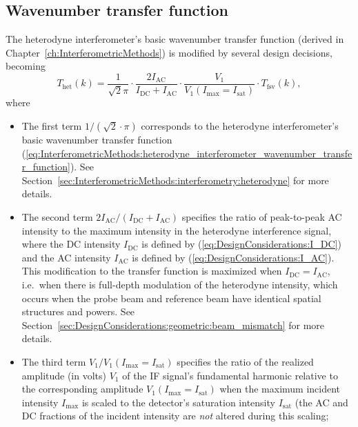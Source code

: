 \subsection{Wavenumber transfer function}
\label{sec:DesignConsiderations:summary:wavenumber_transfer_function}
The heterodyne interferometer's basic wavenumber transfer function
(derived in Chapter~\ref{ch:InterferometricMethods})
is modified by several design decisions, becoming
\begin{equation}
  T_{\text{het}}(k)
  =
  \frac{1}{\sqrt{2} \pi}
  \cdot
  \frac{2 I_{\text{AC}}}{I_{\text{DC}} + I_{\text{AC}}}
  \cdot
  \frac{V_1}{V_1(I_{\text{max}} = I_{\text{sat}})}
  \cdot
  T_{\text{fsv}}(k),
  \label{eq:DesignConsiderations:summary:heterodyne_interferometer_wavenumber_transfer_function}
\end{equation}
where
\begin{itemize}
  \item The first term $1 / (\sqrt{2} \cdot \pi)$
    corresponds to the heterodyne interferometer's
    basic wavenumber transfer function
    (\ref{eq:InterferometricMethods:heterodyne_interferometer_wavenumber_transfer_function}).
    See Section~\ref{sec:InterferometricMethods:interferometry:heterodyne}
    for more details.
  \item The second term $2 I_{\text{AC}} / (I_{\text{DC}} + I_{\text{AC}})$
    specifies the ratio of peak-to-peak AC intensity to the maximum intensity
    in the heterodyne interference signal, where
    the DC intensity $I_{\text{DC}}$ is defined by
    (\ref{eq:DesignConsiderations:I_DC}) and
    the AC intensity $I_{\text{AC}}$ is defined by
    (\ref{eq:DesignConsiderations:I_AC}).
    This modification to the transfer function
    is maximized when $I_{\text{DC}} = I_{\text{AC}}$, i.e.\
    when there is full-depth modulation of the heterodyne intensity, which
    occurs when the probe beam and reference beam
    have identical spatial structures and powers.
    See Section~\ref{sec:DesignConsiderations:geometric:beam_mismatch}
    for more details.
  \item The third term $V_1 / V_1(I_{\text{max}} = I_{\text{sat}})$
    specifies the ratio of the realized amplitude (in volts) $V_1$
    of the IF signal's fundamental harmonic
    relative to the corresponding amplitude
    $V_1(I_{\text{max}} = I_{\text{sat}})$
    when the maximum incident intensity $I_{\text{max}}$
    is scaled to the detector's saturation intensity $I_{\text{sat}}$
    (the AC and DC fractions of the incident intensity
    are \emph{not} altered during this scaling;

\end{itemize}
